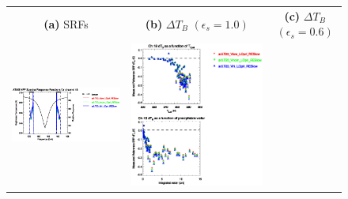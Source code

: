 \begin{figure}[H]
  \centering
  \begin{tabular}{c c c}
    \textsf{\textbf{(a)} SRFs} &
    \textsf{\textbf{(b)} $\Delta T_B$ $(\epsilon_s = 1.0)$} &
    \textsf{\textbf{(c)} $\Delta T_B$ $(\epsilon_s = 0.6)$} \\
    \includegraphics[bb=80 400 280 558,clip,scale=0.85]{graphics/srf/Vset/atms_npp.ch18.osrf.eps} &
    \includegraphics[bb=85 400 260 558,clip,scale=0.85]{graphics/dtb/Vset/e1.0_r0.0/atms_npp.ch18.dTb.eps} & 

\end{tabular}
\end{figure}
